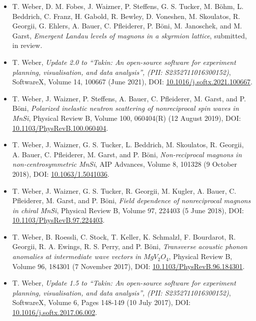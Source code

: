 \begin{itemize}
	\item T. Weber, D. M. Fobes, J. Waizner, P. Steffens, G. S. Tucker,
	M. B\"ohm, L. Beddrich, C. Franz, H. Gabold, R. Bewley,
	D. Voneshen, M. Skoulatos, R. Georgii, G. Ehlers, A. Bauer,
	C. Pfleiderer, P. B\"oni, M. Janoschek, and M. Garst, 
	\textit{Emergent Landau levels of magnons in a skyrmion lattice},
	submitted, in review.

	\item T. Weber, \textit{Update 2.0 to ``Takin: An open-source software for experiment planning, visualisation, and data analysis'', (PII: S2352711016300152)},
	SoftwareX, Volume 14, 100667 (June 2021),
	DOI: \href{https://doi.org/10.1016/j.softx.2021.100667}{10.1016/j.softx.2021.100667}.

	\item T. Weber, J. Waizner, P. Steffens, A. Bauer, C. Pfleiderer, M. Garst, and P. B\"oni, 
	\textit{Polarized inelastic neutron scattering of nonreciprocal spin waves in MnSi},
	Physical Review B, Volume 100, 060404(R) (12 August 2019),
	DOI: \href{https://doi.org/10.1103/PhysRevB.100.060404}{10.1103/PhysRevB.100.060404}.

	\item  T. Weber, J. Waizner, G. S. Tucker, L. Beddrich, M. Skoulatos, R. Georgii, A. Bauer, C. Pfleiderer, M. Garst, and P. B\"oni, 
	\textit{Non-reciprocal magnons in non-centrosymmetric MnSi},
	AIP Advances, Volume 8, 101328 (9 October 2018),
	DOI: \href{https://doi.org/10.1063/1.5041036}{10.1063/1.5041036}.

	\item T. Weber, J. Waizner, G. S. Tucker, R. Georgii, M. Kugler, A. Bauer, C. Pfleiderer, M. Garst, and P. B\"oni, 
	\textit{Field dependence of nonreciprocal magnons in chiral MnSi},
	Physical Review B, Volume 97, 224403 (5 June 2018),
	DOI: \href{https://doi.org/10.1103/PhysRevB.97.224403}{10.1103/PhysRevB.97.224403}.

	\item T. Weber, B. Roessli, C. Stock, T. Keller, K. Schmalzl, F. Bourdarot, R. Georgii, R. A. Ewings, R. S. Perry, and P. B\"oni, 
	\textit{Transverse acoustic phonon anomalies at intermediate wave vectors in $MgV_2O_4$},
	Physical Review B, Volume 96, 184301 (7 November 2017),
	DOI: \href{https://doi.org/10.1103/PhysRevB.96.184301}{10.1103/PhysRevB.96.184301}.
	
	\item T. Weber, \textit{Update 1.5 to ``Takin: An open-source software for experiment planning, visualisation, and data analysis'', (PII: S2352711016300152)},
	SoftwareX, Volume 6, Pages 148-149 (10 July 2017),
	DOI: \href{https://doi.org/10.1016/j.softx.2017.06.002}{10.1016/j.softx.2017.06.002}.


\end{itemize}
